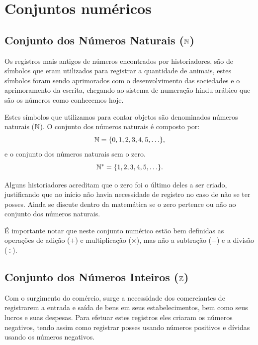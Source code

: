 
\chapter{Conjuntos numéricos}
\section{Conjunto dos Números Naturais (\texorpdfstring{$\mathbb{N}$}{N})}

Os registros mais antigos de números encontrados por historiadores, são de símbolos que eram utilizados para registrar a quantidade de animais, estes símbolos foram sendo aprimorados com o desenvolvimento das sociedades e o aprimoramento da escrita, chegando ao sistema de numeração hindu-arábico que são os números como conhecemos hoje.

Estes símbolos que utilizamos para contar objetos são denominados números naturais ($\mathbb{N}$). O conjunto dos números naturais é composto por:
\[\mathbb{N}= \{0, 1, 2, 3, 4, 5, \ldots \},\]
e o conjunto dos números naturais sem o zero.
\[\mathbb{N}^{*}= \{1, 2, 3, 4, 5, \ldots \}.\]

Alguns historiadores acreditam que o zero foi o último deles a ser criado, justificando que no início não havia necessidade de registro no caso de não se ter posses. Ainda se discute dentro da matemática se o zero pertence ou não ao conjunto dos números naturais.

É importante notar que neste conjunto numérico estão bem definidas as operações de adição ($+$) e multiplicação ($\times$), mas não a subtração ($-$) e a divisão ($\div$).

\section{Conjunto dos Números Inteiros (\texorpdfstring{$\mathbb{Z}$}{Z})}

Com o surgimento do comércio, surge a necessidade dos comerciantes de registrarem a entrada e saída de bens em seus estabelecimentos, bem como seus lucros e suas despesas. Para efetuar estes registros eles criaram os números negativos, tendo assim como registrar posses usando números positivos e dívidas usando os números negativos.

